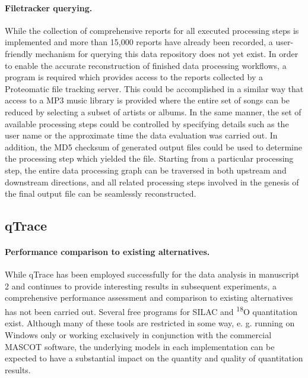 \paragraph{Filetracker querying.}

While the collection of comprehensive reports for all executed processing steps
is implemented and more than 15,000 reports have already been recorded, a
user-friendly mechanism for querying this data repository does not yet exist.
In order to enable the accurate reconstruction of finished data processing 
workflows, a program is required which provides access to the reports collected
by a Proteomatic file tracking server.
This could be accomplished in a similar way that access to a MP3 music library 
is provided where the entire set of songs can be reduced by selecting a subset 
of artists or albums. 
In the same manner, the set of available processing steps could be controlled
by specifying details such as the user name or the approximate time the data
evaluation was carried out.
In addition, the MD5 checksum of generated output files could be used to 
determine the processing step which yielded the file.
Starting from a particular processing step, the entire data processing graph
can be traversed in both upstream and downstream directions, and all related
processing steps involved in the genesis of the final output file can
be seamlessly reconstructed.


\subsection{qTrace}

\paragraph{Performance comparison to existing alternatives.}

While qTrace has been employed successfully for the data analysis in 
manuscript 2 and continues to provide interesting results in subsequent 
experiments, a comprehensive performance assessment and comparison to existing 
alternatives has not been carried out.
Several free programs for SILAC \citep{Kohlbacher2007, Cox2008, Mortensen2010} 
and \textsuperscript{18}O quantitation \citep{Halligan2005, Shinkawa2005} exist.
Although many of these tools are restricted in some way, e. g. running on
Windows only or working exclusively in conjunction with the commercial MASCOT
software, the underlying models in each implementation can be expected to
have a substantial impact on the quantity and quality of quantitation results.

